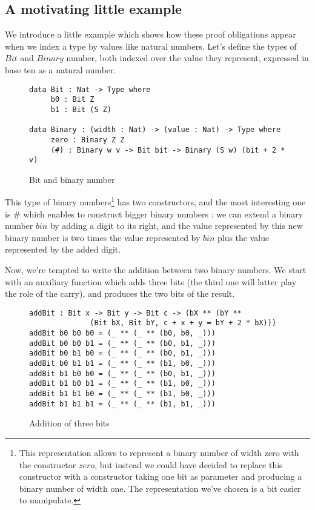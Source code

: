 \subsection{A motivating little example}
We introduce a little example which shows how these proof obligations appear when we index a type by values like natural numbers.
Let's define the types of $Bit$ and $Binary$ number, both indexed over the value they represent, expressed in base ten as a natural number.
\begin{figure}[H]
\figrule
\begin{center}
\begin{verbatim}
data Bit : Nat -> Type where
     b0 : Bit Z
     b1 : Bit (S Z)
     
data Binary : (width : Nat) -> (value : Nat) -> Type where
     zero : Binary Z Z
     (#) : Binary w v -> Bit bit -> Binary (S w) (bit + 2 * v)
\end{verbatim}
\end{center}
\caption{Bit and binary number}
\figrule
\end{figure}

This type of binary numbers\footnote{This representation allows to represent a binary number of width zero with the constructor $zero$, but instead we could have decided to replace this constructor with a constructor taking one bit as parameter and producing a binary number of width one. The representation we've chosen is a bit easier to manipulate.}  has two constructors, and the most interesting one is $\#$ which enables to construct bigger binary numbers : we can extend a binary number $bin$ by adding a digit to its right, and the value represented by this new binary number is two times the value represented by $bin$ plus the value represented by the added digit.

Now, we're tempted to write the addition between two binary numbers.
We start with an auxiliary function which adds three bits (the third one will latter play the role of the carry), and produces the two bits of the result.

\begin{figure}[H]
\figrule
\begin{center}
\begin{verbatim}
addBit : Bit x -> Bit y -> Bit c -> (bX ** (bY ** 
              (Bit bX, Bit bY, c + x + y = bY + 2 * bX)))
addBit b0 b0 b0 = (_ ** (_ ** (b0, b0, _)))
addBit b0 b0 b1 = (_ ** (_ ** (b0, b1, _)))
addBit b0 b1 b0 = (_ ** (_ ** (b0, b1, _)))
addBit b0 b1 b1 = (_ ** (_ ** (b1, b0, _)))
addBit b1 b0 b0 = (_ ** (_ ** (b0, b1, _)))
addBit b1 b0 b1 = (_ ** (_ ** (b1, b0, _)))
addBit b1 b1 b0 = (_ ** (_ ** (b1, b0, _)))
addBit b1 b1 b1 = (_ ** (_ ** (b1, b1, _)))
\end{verbatim}
\end{center}
\caption{Addition of three bits}
\figrule
\end{figure}


